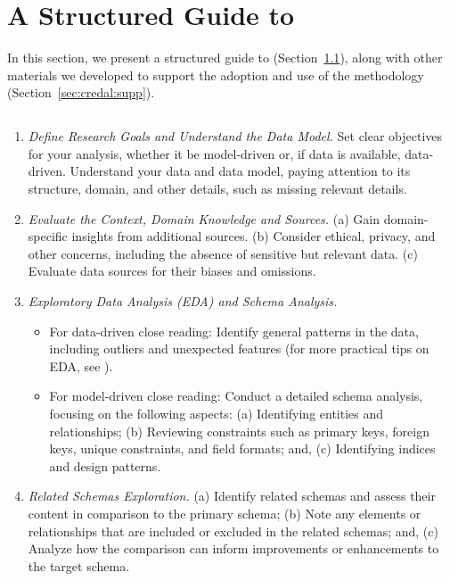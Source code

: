 \section{A Structured Guide to \credal}
\label{sec:credal:guide}

In this section, we present a structured guide to \credal (Section~\ref{sec:credal:guide:steps}), along with other materials we developed to support the adoption and use of the methodology (Section~\ref{sec:credal:supp}).  

\subsection{\credal}
\label{sec:credal:guide:steps}

\begin{enumerate}
\item \emph{Define Research Goals and Understand the Data Model.} Set clear objectives for your analysis, whether it be model-driven or, if data is available,  data-driven.
Understand your data and data model, paying attention to its structure, domain, and other details, such as missing relevant details.

\item \emph{Evaluate the Context, Domain Knowledge and Sources.} 
(a) Gain domain-specific insights from additional sources. 
(b) Consider ethical, privacy, and other concerns, including the absence of sensitive but relevant data. 
(c) Evaluate data sources for their biases and omissions.

\item \emph{Exploratory Data Analysis (EDA) and Schema Analysis.}
\begin{itemize}
    \item For data-driven close reading: Identify general patterns in the data, including outliers and unexpected features (for more practical tips on EDA, see \cite{abedjan,downey}). 
    \item For model-driven close reading: Conduct a detailed schema analysis, focusing on the following aspects:
        (a) Identifying entities and relationships;
        (b) Reviewing constraints such as primary keys, foreign keys, unique constraints, and field formats; and,
        (c) Identifying indices and design patterns.
\end{itemize}

\item \emph{Related Schemas Exploration.}
    (a) Identify related schemas and assess their content in comparison to the primary schema;
    (b) Note any elements or relationships that are included or excluded in the related schemas; and,
    (c) Analyze how the comparison can inform improvements or enhancements to the target schema.


\end{enumerate}
